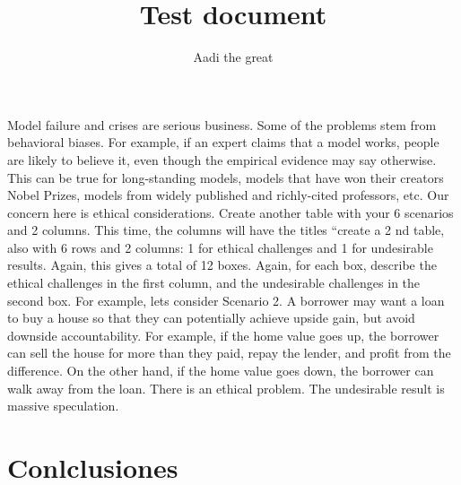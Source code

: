 \documentclass{article}
\title{Test document}
\author{Aadi the great}
\begin{document}
\maketitle

Model failure and crises are serious business. Some of the problems stem from
behavioral biases. For example, if an expert claims that a model works, people are likely
to believe it, even though the empirical evidence may say otherwise. This can be true
for long-standing models, models that have won their creators Nobel Prizes, models
from widely published and richly-cited professors, etc.
Our concern here is ethical considerations. Create another table with your 6 scenarios
and 2 columns. This time, the columns will have the titles “create a 2
nd
table, also with 6
rows and 2 columns: 1 for ethical challenges and 1 for undesirable
results. Again, this gives a total of 12 boxes. Again, for each box, describe the ethical
challenges in the first column, and the undesirable challenges in the second box.
For example, lets consider Scenario 2. A borrower may want a loan to buy a house so
that they can potentially achieve upside gain, but avoid downside accountability. For
example, if the home value goes up, the borrower can sell the house for more than they
paid, repay the lender, and profit from the difference. On the other hand, if the home
value goes down, the borrower can walk away from the loan. There is an ethical
problem. The undesirable result is massive speculation.

\section{Conlclusiones}
\end{document}
